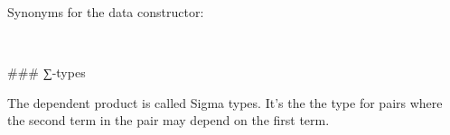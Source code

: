 Synonyms for the data constructor:
\begin{code}%
\>[0]\AgdaSpace{}%
\AgdaSpace{}%
\AgdaSymbol{=}\AgdaSpace{}%
\<%
\\
\>[0]\AgdaSpace{}%
%
\>[13]\AgdaSymbol{=}\AgdaSpace{}%
\<%
\end{code}

### ∑-types

The dependent product is called Sigma types. It's the the type for pairs where
the second term in the pair may depend on the first term.

\begin{code}%
\>[0]\<%
\\
\>[0][@{}l@{\AgdaIndent{0}}]%
\>[2]\AgdaSpace{}%
\AgdaSymbol{\{}\AgdaSymbol{\}\{}\AgdaSymbol{\}}\AgdaSpace{}%
\AgdaSymbol{(}\AgdaSpace{}%
\AgdaSymbol{:}\AgdaSpace{}%
\AgdaSpace{}%
\AgdaSymbol{)(}\AgdaSpace{}%
\AgdaSymbol{:}\AgdaSpace{}%
\AgdaSpace{}%
\AgdaSpace{}%
\AgdaSpace{}%
\AgdaSymbol{)}\<%
\\
\>[2][@{}l@{\AgdaIndent{0}}]%
\>[3]\AgdaSymbol{:}\AgdaSpace{}%
\AgdaSpace{}%
\AgdaSymbol{(}\AgdaSpace{}%
\AgdaSpace{}%
\AgdaSymbol{)}\<%
\\
%
\>[2]\<%
\\
%
\>[2]\AgdaSpace{}%
\AgdaOperator{\AgdaInductiveConstructor{\AgdaUnderscore{},\AgdaUnderscore{}}}\<%
\\
%
\>[2]\<%
\\
\>[2][@{}l@{\AgdaIndent{0}}]%
\>[4]\AgdaSpace{}%
\AgdaSymbol{:}\AgdaSpace{}%
\<%
\\
%
\>[4]\AgdaSpace{}%
\AgdaSymbol{:}\AgdaSpace{}%
\AgdaSpace{}%
\<%
\\
%
\\[\AgdaEmptyExtraSkip]%
\>[0]\AgdaSpace{}%
\AgdaSpace{}%
\AgdaOperator{\AgdaInductiveConstructor{\AgdaUnderscore{},\AgdaUnderscore{}}}\<%
\\
\>[0]\AgdaSpace{}%
\AgdaSpace{}%
\<%
\end{code}

